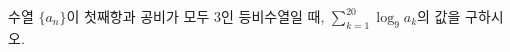 \hspace*{2mm}\begin{minipage}[t]{\dimexpr\linewidth-2mm\relax}\vspace{0pt}
수열 $\{a_n\}$이 첫째항과 공비가 모두 $3$인 등비수열일 때, $\displaystyle\sum_{k=1}^{20}\log_9 a_k$의 값을 구하시오.\end{minipage}
